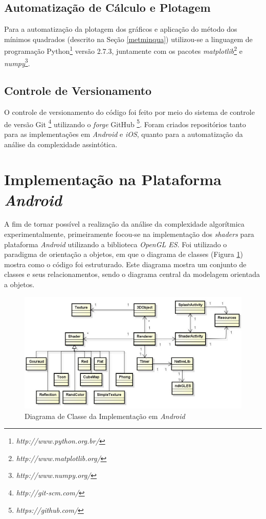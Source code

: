 \subsection{Automatização de Cálculo e Plotagem}

	Para a automatização da plotagem dos gráficos e aplicação do método dos mínimos quadrados (descrito na Seção \ref{metminqua}) utilizou-se a linguagem de programação Python\footnote{\textit{http://www.python.org.br/}} versão 2.7.3, juntamente com os pacotes  \textit{matplotlib}\footnote{\textit{http://www.matplotlib.org/}} e  \textit{numpy}\footnote{\textit{http://www.numpy.org/}}. 

\subsection{Controle de Versionamento}

	O controle de versionamento do código foi feito por meio do sistema de controle de versão Git \footnote{\textit{http://git-scm.com/}} utilizando o \textit{forge} GitHub \footnote{\textit{https://github.com/}}. Foram criados repositórios tanto para as implementações em \textit{Android} e \textit{iOS}, quanto para a automatização da análise da complexidade assintótica.

\section{Implementação na Plataforma \textit{Android}} 
\label{imp}

	 A fim de tornar possível a realização da análise da complexidade algorítmica experimentalmente, primeiramente focou-se na implementação dos \textit{shaders} para plataforma \textit{Android} utilizando a biblioteca \textit{OpenGL ES}. Foi utilizado  o paradigma de orientação a objetos, em que o diagrama de classes (Figura \ref{class_diagram}) mostra como o código foi estruturado. Este diagrama mostra um conjunto de classes e seus relacionamentos, sendo o diagrama central da modelagem orientada a objetos. 

	\begin{figure}[ht]
	\centering
		\includegraphics[keepaspectratio=true,scale=0.6]{figuras/class_diagram.jpg}
	\caption{Diagrama de Classe da Implementação em \textit{Android}}
	\label{class_diagram}
	\end{figure}

